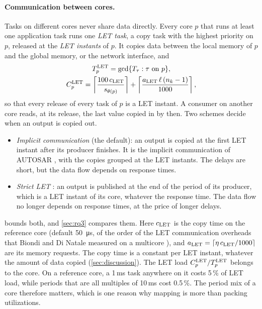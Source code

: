 \paragraph{Communication between cores.} Tasks on different cores never
share data directly. Every core $p$ that runs at least one application
task runs one \emph{LET task}, a copy task with the highest priority on
$p$, released at the \emph{LET instants} of $p$. It copies data between
the local memory of $p$ and the global memory, or the network interface,
and
\begin{gather}
T^{\mathrm{LET}}_p=\gcd\{T_\tau:\tau\text{ on }p\},\nonumber\\
C^{\mathrm{LET}}_p=\left\lceil \frac{100\,c_{\mathrm{LET}}}{s_{\theta(p)}} \right\rceil
	+\left\lceil \frac{a_{\mathrm{LET}}\,\ell\,(n_k-1)}{1000} \right\rceil,
\label{eq:let}
\end{gather}
so that every release of every task of $p$ is a LET instant. A consumer
on another core reads, at its release, the last value copied in by then.
Two schemes decide when an output is copied out.
\begin{itemize}
\item \emph{Implicit communication} (the default): an output is copied at
the first LET instant after its producer finishes. It is the implicit
communication of AUTOSAR \cite{hamann2017communication}, with the copies
grouped at the LET instants. The delays are short, but the data flow
depends on response times.
\item \emph{Strict LET} \cite{kirsch2012let,biondi2018achieving}: an output
is published at the end of the period of its producer, which is a LET
instant of its core, whatever the response time. The data flow no longer
depends on response times, at the price of longer delays.
\end{itemize}
 bounds both, and \cref{sec:rq3} compares them. Here
$c_{\mathrm{LET}}$ is the copy time on the reference core (default
\SI{50}{\micro s}, of the order of the LET communication overheads that
Biondi and Di Natale measured on a multicore \cite{biondi2018achieving}),
and $a_{\mathrm{LET}}=\lceil\eta\,c_{\mathrm{LET}}/1000\rceil$ are its memory requests.
The copy time is a constant per LET instant, whatever the amount of data
copied (\cref{sec:discussion}).
The LET load $C^{\mathrm{LET}}_p/T^{\mathrm{LET}}_p$ belongs to the core. On a reference
core, a 1\,ms task anywhere on it costs 5\,\% of LET load, while periods that
are all multiples of 10\,ms cost 0.5\,\%. The period mix of a core
therefore matters, which is one reason why mapping is more than packing
utilizations.


